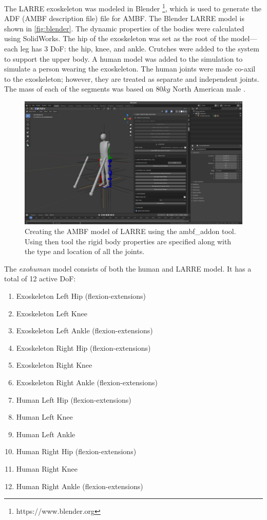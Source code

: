  The LARRE exoskeleton was modeled in Blender \footnote{https://www.blender.org}, which is used to generate the ADF (AMBF description file) file for AMBF. The Blender LARRE model is shown in \autoref{fig:blender}. The dynamic properties of the bodies were calculated using SolidWorks. The hip of the exoskeleton was set as the root of the model—each leg has 3 DoF: the hip, knee, and ankle. Crutches were added to the system to support the upper body. A human model was added to the simulation to simulate a person wearing the exoskeleton. The human joints were made co-axil to the exoskeleton; however, they are treated as separate and independent joints. The mass of each of the segments was based on $80kg$ North American male \cite{BMI} \cite{drillis1964body}.
 
 \begin{figure}[h]
     \centering
     \includegraphics[scale=0.2]{images/sim/blender.png}
     \caption[Blender Model of LARRE]{Creating the AMBF model of LARRE using the ambf\_addon tool. Using then tool the rigid body properties are specified along with the type and location of all the joints.}
     \label{fig:blender}
 \end{figure}
 
 
 The \textit{exohuman} model consists of both the human and LARRE model. It has a total of 12 active DoF:

\begin{enumerate}
  \item Exoskeleton Left Hip (flexion-extensions)
  \item Exoskeleton Left Knee
  \item Exoskeleton Left Ankle (flexion-extensions)
  \item Exoskeleton Right Hip (flexion-extensions)
  \item Exoskeleton Right Knee
  \item Exoskeleton Right Ankle (flexion-extensions)
  \item Human Left Hip (flexion-extensions)
  \item Human Left Knee
  \item Human Left Ankle
  \item Human Right Hip (flexion-extensions)
  \item Human Right Knee
  \item Human Right Ankle (flexion-extensions)
\end{enumerate}


